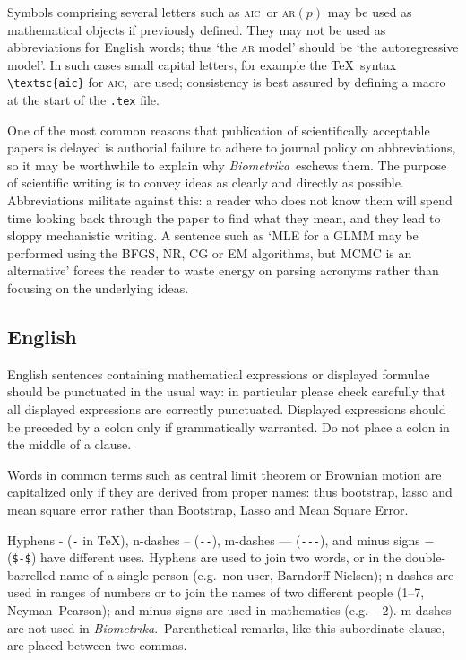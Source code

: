 \documentclass[lineno]{biometrika}
\def\Bka{{\it Biometrika}}
\def\AIC{\textsc{aic}}
\begin{document}
Symbols comprising several letters such as \AIC\ or \textsc{ar}$(p)$ may be used as mathematical objects if previously defined. They may not be used as abbreviations for English words; thus `the \textsc{ar} model' should be `the autoregressive model'.   In such cases small capital letters, for example the  \TeX\ syntax \verb+\textsc{aic}+ for \AIC,\ are used; consistency is best assured by defining a macro at the start of the \texttt{.tex}  file.

One of the most common reasons that publication of scientifically acceptable papers is delayed is authorial  failure to adhere to journal policy on abbreviations, so it may be worthwhile to explain why \Bka\ eschews them. The purpose of scientific writing is to convey ideas as clearly and directly as possible.  Abbreviations militate against this: a reader who does not know them will spend time looking back through the paper to find what they mean, and they lead to sloppy mechanistic writing. A sentence such as `MLE for a GLMM may be performed using the BFGS, NR, CG or EM algorithms, but MCMC is an alternative' forces the reader to waste energy on parsing acronyms  rather than focusing on the underlying ideas.

\subsection{English}

English sentences containing mathematical expressions or displayed formulae should be punctuated in the usual way: in particular please check carefully that all displayed expressions are correctly punctuated.  Displayed expressions should be preceded by a colon only if grammatically warranted. Do not place a colon in the middle of a clause.

Words in common terms such as central limit theorem or Brownian motion are capitalized only if they are derived from proper names: thus bootstrap,  lasso and mean square error rather than Bootstrap, Lasso and  Mean Square Error.

Hyphens - (\verb+-+ in \TeX), n-dashes -- (\verb+--+), m-dashes --- (\verb+---+), and minus signs $-$ (\verb+$-$+) have different uses.  Hyphens are used to join two words, or in the double-barrelled name of a single person (e.g.\ non-user, Barndorff-Nielsen); n-dashes are used in ranges of numbers or to join the names of two different people (1--7, Neyman--Pearson); and minus signs are used in mathematics (e.g. $-2$). m-dashes are not used in \Bka.\  Parenthetical remarks, like this subordinate clause, are placed between two commas.
\end{document}
